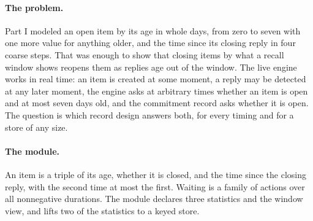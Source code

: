 \documentclass[11pt]{article}
\theoremstyle{definition}
\theoremstyle{plain}
\begin{document}
\paragraph{The problem.} Part I modeled an open item by its age in whole days, from zero to seven
with one more value for anything older, and the time since its closing reply in four coarse
steps. That was enough to show that closing
items by what a recall window shows reopens them as replies age out of the window. The live engine
works in real time: an item is created at some moment, a reply may be detected at any later moment,
the engine asks at arbitrary times whether an item is open and at most seven days old, and the
commitment record asks whether it is open. The question is which record design answers both, for
every timing and for a store of any size.

\paragraph{The module.} An item is a triple of its age, whether it is closed, and the time since
the closing reply, with the second time at most the first. Waiting is a family of actions over all
nonnegative durations. The module declares three statistics and the window view, and lifts two of
the statistics to a keyed store.
\end{document}
